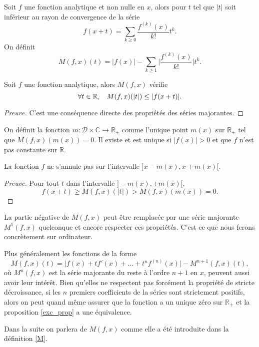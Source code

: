 \documentclass[a4paper,10pt]{article}
\begin{document}
	\begin{definition}Soit $f$ une fonction analytique et non nulle en $x$, alors pour $t$ tel que $|t|$ soit inférieur au rayon de convergence de la série
		\[f(x+t)=\sum_{k\geq0} \frac{f^{(k)}(x)}{k!}t^{k}.\] 
		On définit \[M(f,x)(t)=|f(x)|-\sum_{k\geq1}\Big|\frac{f^{(k)}(x)}{k!}\Big|t^{k}.\]
		\label{M}
	\end{definition}
	\vspace{3mm}
	\begin{proposition}
		Soit $f$ une fonction analytique, alors $M(f,x)$ vérifie 
		\[\forall t \in \mathbb{R}, \hspace{3mm} M(f,x)(|t|) \leq |f(x+t)|.\]
		\label{ineq_M}
	\end{proposition}
	\begin{proof} [Preuve]
		C'est une conséquence directe des propriétés des séries majorantes.
	\end{proof}
	\begin{definition}
		On définit la fonction $m:\mathcal{D}\times \mathbb{C}\rightarrow \mathbb{R}_+$ comme l'unique point $m(x)$ sur $\mathbb{R}_+$ tel que $M(f,x)(m(x))=0$.
		Il existe et est unique si $|f(x)|>0$ et que $f$ n'est pas constante sur $\mathbb{R}$.
		\label{m}
	\end{definition} 
	\vspace{3mm}
	\begin{proposition}
		La fonction $f$ ne s'annule pas sur l'intervalle $]x-m(x),x+m(x)[$.
		\label{exc_prop}
	\end{proposition}
	\begin{proof}[Preuve]
		Pour tout $t$ dans l'intervalle $]-m(x),+m(x)[$, 
		\[f(x+t)\geq M(f,x)(|t|)>M(f,x)(m(x))=0.\]
	\end{proof}
	La partie négative de $M(f,x)$ peut être remplacée par une série majorante $M^1(f,x)$ quelconque et encore respecter ces propriétés. C'est ce que nous ferons concrètement sur ordinateur.\\
	\begin{remarque}
		Plus généralement les fonctions de la forme
		\begin{equation}
		M(f,x)(t)=\big|f(x)+tf'(x)+...+t^{n}f^{(n)}(x)\big|-M^{n+1}(f,x)(t),
		\label{bis_maj}
		\end{equation}
		où $M^{n}(f,x)$ est la série  majorante du reste à l'ordre $n+1$ en $x$, peuvent aussi avoir leur intérêt. Bien qu'elles ne respectent pas forcément la propriété de stricte décroissance, si les $n$ premiers coefficients de la séries sont strictement positifs, alors on peut quand même assurer que la fonction a un unique zéro sur $\mathbb{R}_+$ et la proposition \ref{exc_prop} a une équivalence.
	\end{remarque}
	Dans la suite on parlera de $M(f,x)$ comme elle a été introduite dans la définition \eqref{M}. 
	
\end{document}
